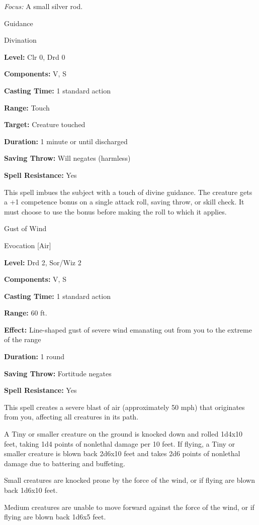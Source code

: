 \documentclass{article}
\begin{document}
\textit{Focus: }A small silver rod.

\vspace{12pt}
Guidance

Divination

\textbf{Level:} Clr 0, Drd 0

\textbf{Components:} V, S

\textbf{Casting Time:} 1 standard action

\textbf{Range:} Touch

\textbf{Target:} Creature touched

\textbf{Duration:} 1 minute or until discharged

\textbf{Saving Throw: }Will negates (harmless)

\textbf{Spell Resistance:} Yes

This spell imbues the subject with a touch of divine guidance. The creature gets 
a +1 competence bonus on a single attack roll, saving throw, or skill check. It 
must choose to use the bonus before making the roll to which it applies.

\vspace{12pt}
Gust of Wind

Evocation [Air]

\textbf{Level:} Drd 2, Sor/Wiz 2

\textbf{Components:} V, S

\textbf{Casting Time:} 1 standard action

\textbf{Range:} 60 ft.

\textbf{Effect:} Line-shaped gust of severe wind emanating out from you to the 
extreme of the range

\textbf{Duration:} 1 round

\textbf{Saving Throw:} Fortitude negates

\textbf{Spell Resistance:} Yes

This spell creates a severe blast of air (approximately 50 mph) that originates 
from you, affecting all creatures in its path.

A Tiny or smaller creature on the ground is knocked down and rolled 1d4x10 feet, 
taking 1d4 points of nonlethal damage per 10 feet. If flying, a Tiny or smaller 
creature is blown back 2d6x10 feet and takes 2d6 points of nonlethal damage due 
to battering and buffeting.

Small creatures are knocked prone by the force of the wind, or if flying are blown 
back 1d6x10 feet.

Medium creatures are unable to move forward against the force of the wind, or if 
flying are blown back 1d6x5 feet.
\end{document}
